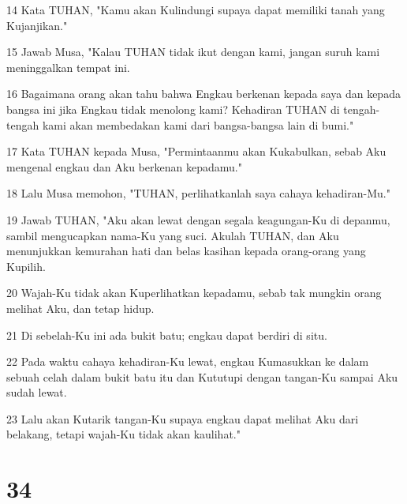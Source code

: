 \par 14 Kata TUHAN, "Kamu akan Kulindungi supaya dapat memiliki tanah yang Kujanjikan."
\par 15 Jawab Musa, "Kalau TUHAN tidak ikut dengan kami, jangan suruh kami meninggalkan tempat ini.
\par 16 Bagaimana orang akan tahu bahwa Engkau berkenan kepada saya dan kepada bangsa ini jika Engkau tidak menolong kami? Kehadiran TUHAN di tengah-tengah kami akan membedakan kami dari bangsa-bangsa lain di bumi."
\par 17 Kata TUHAN kepada Musa, "Permintaanmu akan Kukabulkan, sebab Aku mengenal engkau dan Aku berkenan kepadamu."
\par 18 Lalu Musa memohon, "TUHAN, perlihatkanlah saya cahaya kehadiran-Mu."
\par 19 Jawab TUHAN, "Aku akan lewat dengan segala keagungan-Ku di depanmu, sambil mengucapkan nama-Ku yang suci. Akulah TUHAN, dan Aku menunjukkan kemurahan hati dan belas kasihan kepada orang-orang yang Kupilih.
\par 20 Wajah-Ku tidak akan Kuperlihatkan kepadamu, sebab tak mungkin orang melihat Aku, dan tetap hidup.
\par 21 Di sebelah-Ku ini ada bukit batu; engkau dapat berdiri di situ.
\par 22 Pada waktu cahaya kehadiran-Ku lewat, engkau Kumasukkan ke dalam sebuah celah dalam bukit batu itu dan Kututupi dengan tangan-Ku sampai Aku sudah lewat.
\par 23 Lalu akan Kutarik tangan-Ku supaya engkau dapat melihat Aku dari belakang, tetapi wajah-Ku tidak akan kaulihat."

\chapter{34}

